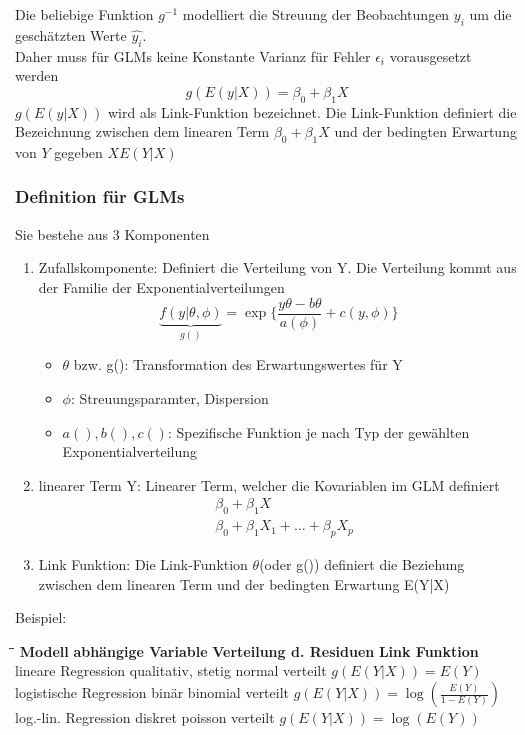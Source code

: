 \documentclass[10pt]{report}
\theoremstyle{definition}
\begin{document}
Die beliebige Funktion \(g^{-1}\) modelliert die Streuung der Beobachtungen \( y_i\) um die geschätzten Werte \(\hat{y_i}\). \\
Daher muss für GLMs keine Konstante Varianz für Fehler \(\epsilon_i\) vorausgesetzt werden
\[
g(E(y|X)) = \beta_0 + \beta_1 X
\]
\(g(E(y|X))\) wird als Link-Funktion bezeichnet.
Die Link-Funktion definiert die Bezeichnung zwischen dem linearen Term \(\beta_0+ \beta_1 X\) und der bedingten Erwartung von \(Y\) gegeben \(X E(Y|X)\)

\subsubsection*{Definition für GLMs}
Sie bestehe aus 3 Komponenten 
\begin{enumerate}
	\item Zufallskomponente: Definiert die Verteilung von Y. 
	Die Verteilung kommt aus der Familie der Exponentialverteilungen	
	\[
	\underbrace{f(y | \theta, \phi)}_{g()} = \exp\{\frac{y\theta- b\theta}{a(\phi)} + c(y, \phi)\}
	\]
	\begin{itemize}
		\item [] \(\theta\) bzw. g(): Transformation des Erwartungswertes für Y
		\item [] \(\phi\): Streuungsparamter, Dispersion
		\item [] \(a(),b(), c()\): Spezifische Funktion je nach Typ der gewählten Exponentialverteilung
		
	\end{itemize}

	\item linearer Term Y:
	Linearer Term, welcher die Kovariablen im GLM definiert
	\begin{align*}
		&\beta_0 +\beta_1 X \\
		&\beta_0 + \beta_1 X_1 + \ldots + \beta_p X_p
	\end{align*}
	
	\item Link Funktion:
	Die Link-Funktion \(\theta\)(oder g()) definiert die Beziehung zwischen dem linearen Term und der bedingten Erwartung E(Y|X)
\end{enumerate}

Beispiel:
\begin{tabbing}
	\hspace{0.25\linewidth}\=\hspace{0.25\linewidth}\=\hspace{0.25\linewidth}\=\kill
	\textbf{Modell}	\>  \textbf{abhängige Variable}\>  \textbf{Verteilung d. Residuen}\> \textbf{Link Funktion}\\ 
	lineare Regression\>  qualitativ, stetig\>  normal verteilt\> \(g(E(Y|X)) = E(Y)\)\\ 
	logistische Regression\>  binär\>  binomial verteilt\> \(g(E(Y|X)) = \log(\frac{E(Y)}{1-E(Y)}) \)\\ 
	log.-lin. Regression\>  diskret \>  poisson verteilt\> \(g(E(Y|X)) = \log(E(Y))\)\\
\end{tabbing} 
\end{document}
